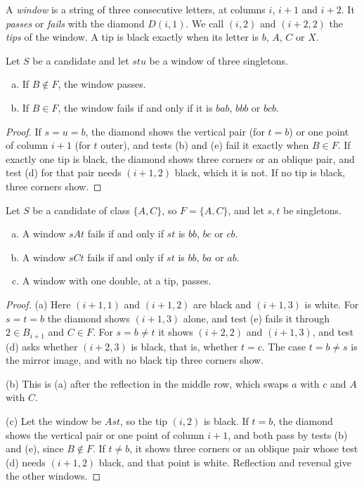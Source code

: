A \emph{window} is a string of three consecutive letters, at columns $i$, $i+1$ and $i+2$. It
\emph{passes} or \emph{fails} with the diamond $D(i,1)$. We call $(i,2)$ and $(i+2,2)$ the
\emph{tips} of the window. A tip is black exactly when its letter is $b$, $A$, $C$ or $X$.

\begin{lemma}\label{lem:dichotomy}
Let $S$ be a candidate and let $stu$ be a window of three singletons.
\begin{enumerate}[(a)]
\item If $B\notin F$, the window passes.
\item If $B\in F$, the window fails if and only if it is $bab$, $bbb$ or $bcb$.
\end{enumerate}
\end{lemma}

\begin{proof}
If $s=u=b$, the diamond shows the vertical pair (for $t=b$) or one point of column $i+1$ (for
$t$ outer), and tests (b) and (e) fail it exactly when $B\in F$. If exactly one tip is black,
the diamond shows three corners or an oblique pair, and test (d) for that pair needs $(i+1,2)$
black, which it is not. If no tip is black, three corners show.
\end{proof}

\begin{lemma}\label{lem:sixofnine}
Let $S$ be a candidate of class $\{A,C\}$, so $F=\{A,C\}$, and let $s,t$ be singletons.
\begin{enumerate}[(a)]
\item A window $sAt$ fails if and only if $st$ is $bb$, $bc$ or $cb$.
\item A window $sCt$ fails if and only if $st$ is $bb$, $ba$ or $ab$.
\item A window with one double, at a tip, passes.
\end{enumerate}
\end{lemma}

\begin{proof}
(a) Here $(i+1,1)$ and $(i+1,2)$ are black and $(i+1,3)$ is white. For $s=t=b$ the diamond shows
$(i+1,3)$ alone, and test (e) fails it through $2\in B_{i+1}$ and $C\in F$. For $s=b\ne t$ it
shows $(i+2,2)$ and $(i+1,3)$, and test (d) asks whether $(i+2,3)$ is black, that is, whether
$t=c$. The case $t=b\ne s$ is the mirror image, and with no black tip three corners show.

(b) This is (a) after the reflection in the middle row, which swaps $a$ with $c$ and $A$ with $C$.

(c) Let the window be $Ast$, so the tip $(i,2)$ is black. If $t=b$, the diamond shows the
vertical pair or one point of column $i+1$, and both pass by tests (b) and (e), since
$B\notin F$. If $t\ne b$, it shows three corners or an oblique pair whose test (d)
needs $(i+1,2)$ black, and that point is white. Reflection and reversal give the other windows.
\end{proof}

